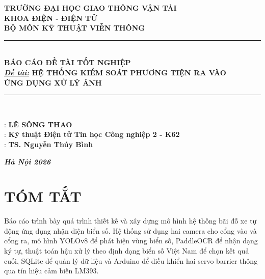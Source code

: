 \documentclass[a4paper,14pt]{extreport}
\begin{document}
\begin{titlepage}
\centering
\vspace*{1cm}
{\Large\bfseries TRƯỜNG ĐẠI HỌC GIAO THÔNG VẬN TẢI}\\[0.2cm]
{\large\bfseries KHOA ĐIỆN - ĐIỆN TỬ}\\[0.2cm]
{\large\bfseries BỘ MÔN KỸ THUẬT VIỄN THÔNG}\\[2cm]

\rule{\textwidth}{1.5pt}\\[0.5cm]
{\LARGE\bfseries BÁO CÁO ĐỀ TÀI TỐT NGHIỆP}\\[0.4cm]
{\Large\bfseries \underline{\textit{Đề tài:}} HỆ THỐNG KIỂM SOÁT PHƯƠNG TIỆN RA VÀO\\[0.2cm] ỨNG DỤNG XỬ LÝ ẢNH}\\[0.5cm]
\rule{\textwidth}{1.5pt}\\[2cm]

\begin{flushleft}
\hspace{2.5cm}{\large\bfseries Sinh viên thực hiện} \hspace{0.5cm} {\large : \textbf{LÊ SÔNG THAO}}\\[0.3cm]
\hspace{2.5cm}{\large\bfseries Lớp - Khóa} \hspace{1.8cm} {\large : \textbf{Kỹ thuật Điện tử Tin học Công nghiệp 2 - K62}}\\[0.3cm]
\hspace{2.5cm}{\large\bfseries Giảng viên hướng dẫn} \hspace{0.05cm} {\large : \textbf{TS. Nguyễn Thúy Bình}}\\
\end{flushleft}

\vfill
{\large\bfseries \textit{Hà Nội 2026}}
\end{titlepage}

\tableofcontents
\newpage
\listoffigures
\newpage
\listoftables
\newpage


\chapter*{TÓM TẮT}

Báo cáo trình bày quá trình thiết kế và xây dựng mô hình hệ thống bãi đỗ xe tự động ứng dụng nhận diện biển số. Hệ thống sử dụng hai camera cho cổng vào và cổng ra, mô hình YOLOv8 để phát hiện vùng biển số, PaddleOCR để nhận dạng ký tự, thuật toán hậu xử lý theo định dạng biển số Việt Nam để chọn kết quả cuối, SQLite để quản lý dữ liệu và Arduino để điều khiển hai servo barrier thông qua tín hiệu cảm biến LM393.
\end{document}
